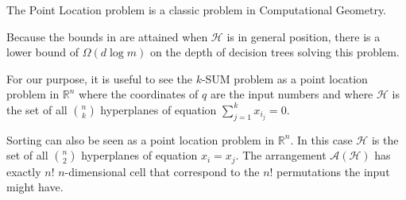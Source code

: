The Point Location problem is a classic problem in Computational Geometry.


Because the bounds in  are attained when \(\mathcal{H}\) is in
general position, there is a lower bound of \(\Omega(d \log m)\) on the depth
of decision trees solving this problem.

For our purpose, it is useful to see the \(k\)-SUM problem as a point location
problem in \(\mathbb{R}^n\) where the coordinates of \(q\) are the input
numbers and where \(\mathcal{H}\) is the set of all \(n \choose k\) hyperplanes
of equation \(\sum_{j=1}^{k} x_{i_j} = 0\).

Sorting can also be seen as a point location problem in \(\mathbb{R}^n\).
In this case \(\mathcal{H}\) is the set of all \(n \choose 2\) hyperplanes of
equation \(x_i = x_j\). The arrangement \(\mathcal{A}(\mathcal{H})\) has
exactly \(n!\) \(n\)-dimensional cell that correspond to the \(n!\)
permutations the input might have.
